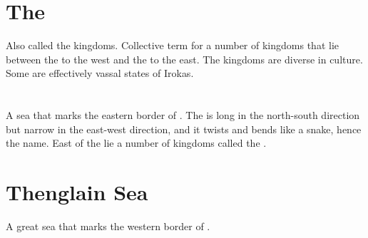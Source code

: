 \section{The \Serplands}
\index{\Serplands}
Also called the \Serpadj{} kingdoms. Collective term for a number of kingdoms that lie between the  to the west and the \Dragonridge{} to the east. The \Serpadj{} kingdoms are diverse in culture. Some are effectively vassal states of Irokas. 















\section{\Serpsea}
\index{\Serpsea}
A sea that marks the eastern border of . The \Serp{} is long in the north-south direction but narrow in the east-west direction, and it twists and bends like a snake, hence the name. East of the \Serp{} lie a number of kingdoms called the . 
\also{\Serplands}
















\section{Thenglain Sea}
A great sea that marks the western border of . 
















